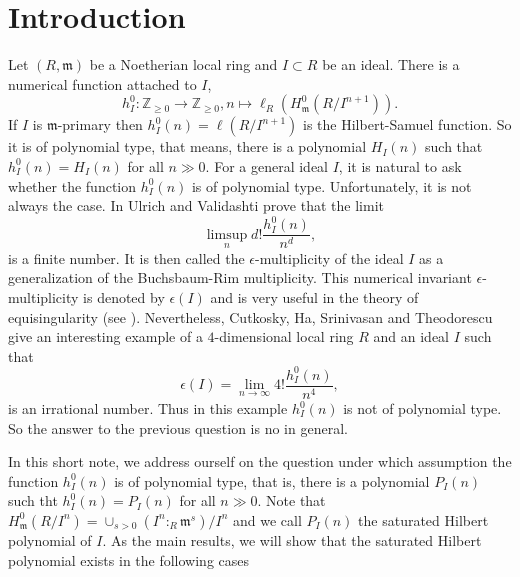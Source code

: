 \documentclass{amsart}
\theoremstyle {definition}
\theoremstyle {remark}
\begin{document}
\maketitle

\section{Introduction}

Let $(R, {\ensuremath{\mathfrak m}})$ be a Noetherian local ring and $I\subset R$ be an ideal. There is a numerical function attached to $I$,
$$h^0_I: {\ensuremath{\mathbb Z}}_{\geq 0}\rightarrow {\ensuremath{\mathbb Z}}_{\geq 0}, n\mapsto \ell_R(H^0_{\ensuremath{\mathfrak m}}(R/I^{n+1})).$$
If $I$ is ${\ensuremath{\mathfrak m}}$-primary then $h^0_I(n)=\ell(R/I^{n+1})$ is the Hilbert-Samuel function. So it is of polynomial type, that means, there is a polynomial $H_I(n)$ such that $h^0_I(n)=H_I(n)$ for all $n\gg 0$. For a general ideal $I$, it is natural to ask whether the function $h^0_I(n)$ is of polynomial type. Unfortunately, it is not always the case. In \cite{UV} Ulrich and Validashti prove that the limit
$$\limsup_n d!\frac{h^0_I(n)}{n^d},$$
is a finite number. It is then called the $\epsilon$-multiplicity of the ideal $I$ as
a generalization of the Buchsbaum-Rim multiplicity. This numerical invariant $\epsilon$-multiplicity is denoted by $\epsilon(I)$ and is very useful in the theory of equisingularity (see \cite{KUV}). Nevertheless, Cutkosky, Ha, Srinivasan and Theodorescu \cite[Theorem 2.2]{CTST} give an interesting example of a $4$-dimensional local ring $R$ and an ideal $I$ such that
$$\epsilon(I)=\lim_{n\to \infty}4!\frac{h^0_I(n)}{n^4},$$
is an irrational number. Thus in this example $h^0_I(n)$ is not of polynomial type. So the answer to the previous question is no in general.

In this short note, we address ourself on the question under which assumption the function $h^0_I(n)$ is of polynomial type, that is, there is a polynomial $P_I(n)$ such tht $h^0_I(n)=P_I(n)$ for all $n\gg 0$. Note that $H^0_{\ensuremath{\mathfrak m}}(R/I^n)=\cup_{s>0}(I^n:_R{\ensuremath{\mathfrak m}}^s)/I^n$ and we call $P_I(n)$ the saturated Hilbert polynomial of $I$. As the main results, we will show that the saturated Hilbert polynomial exists in the following cases
\end{document}
